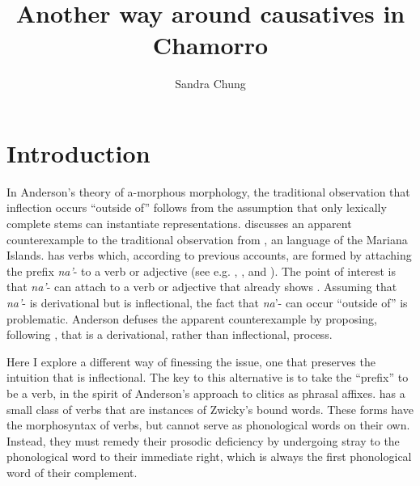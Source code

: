 \documentclass[output=paper,
modfonts
]{LSP/langsci}
\title{Another way around causatives in Chamorro}
\author{%
 Sandra Chung\affiliation{University of California, Santa Cruz}
}
\begin{document}
\maketitle

\section{Introduction}

In Anderson's theory of a-morphous morphology, the traditional
observation that inflection occurs ``outside of''  follows
from the assumption that only lexically complete stems can instantiate
 representations. \citet[127--128]{anderson1992} discusses an
apparent counterexample to the traditional observation from , an
 language of the Mariana Islands.  has 
verbs which, according to previous accounts, are formed by attaching the
prefix \emph{na'}- to a verb or adjective (see e.g. \citealt{baker1985,gibson1980}, \citealt[108]{safford1904}, and \citealt[247--249]{topping1973}). The
point of interest is that \emph{na'}- can attach to a verb or adjective
that already shows . Assuming that \emph{na'}- is
derivational but  is inflectional, the fact that
\emph{na}'- can occur ``outside of''  is problematic.
Anderson defuses the apparent counterexample by proposing, following
\citet[364--365]{durie1986}, that   is a derivational,
rather than inflectional, process.

Here I explore a different way of finessing the issue, one that
preserves the intuition that   is inflectional.
The key to this alternative is to take the  ``prefix'' to be a
 verb, in the spirit of Anderson's \citeyear{anderson2005} approach
to clitics as phrasal affixes.  has a small class of
 verbs that are instances of Zwicky's \citeyear{zwicky1977a} bound
words. These forms have the morphosyntax of verbs, but cannot serve as
phonological words on their own. Instead, they must remedy their
prosodic deficiency by undergoing stray  to the phonological
word to their immediate right, which is always the first phonological
word of their complement.
\end{document}
